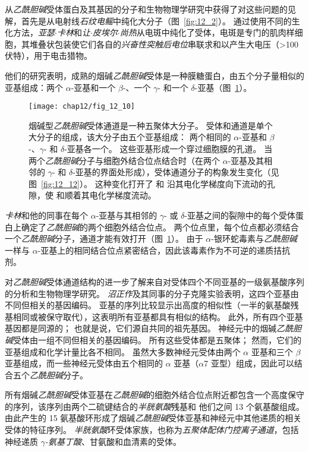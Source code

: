 从\textit{乙酰胆碱}受体蛋白及其基因的分子和生物物理学研究中获得了对这些问题的见解，首先是从电射线\textit{石纹电鳐}中纯化大分子（图~\ref{fig:12_2}）。
通过使用不同的生化方法，\textit{亚瑟$\cdot$卡林}和\textit{让$\cdot$皮埃尔$\cdot$尚热}从电斑中纯化了受体，电斑是专门的肌肉样细胞，其堆叠状包装使它们各自的\textit{兴奋性突触后电位}串联求和以产生大电压（>100 伏特），用于电击猎物。

他们的研究表明，成熟的烟碱\textit{乙酰胆碱}受体是一种膜糖蛋白，由五个分子量相似的亚基组成：两个 $\alpha$-亚基和一个 $\beta$-、一个 $\gamma$- 和一个 $\delta$-亚基（图~\ref{fig:12_10}）。


\begin{figure}[htbp]
	\centering
	\texttt{[image: chap12/fig\_12\_10]}
	\caption{烟碱型\textit{乙酰胆碱}受体通道是一种五聚体大分子。
		受体和通道是单个大分子的组成，该大分子由五个亚基组成：
		两个相同的 $\alpha$-亚基和 $\beta$-、$\gamma$- 和 $\delta$-亚基各一个。
		这些亚基形成一个穿过细胞膜的孔道。
		当两个\textit{乙酰胆碱}分子与细胞外结合位点结合时（在两个 $\alpha$-亚基及其相邻的 $\gamma$- 和 $\delta$-亚基的界面处形成），受体通道分子的构象发生变化（见图~\ref{fig:12_12}）。
		这种变化打开了  和  沿其电化学梯度向下流动的孔隙，使  和顺着其电化学梯度流动。}
	\label{fig:12_10}
\end{figure}


\textit{卡林}和他的同事在每个 $\alpha$-亚基与其相邻的 $\gamma$- 或 $\delta$-亚基之间的裂隙中的每个受体蛋白上确定了\textit{乙酰胆碱}的两个细胞外结合位点。
两个位点里，每个位点都必须结合一个\textit{乙酰胆碱}分子，通道才能有效打开（图~\ref{fig:12_10}）。
由于 $\alpha$-银环蛇毒素与\textit{乙酰胆碱}一样与 $\alpha$-亚基上的相同结合位点紧密结合，因此该毒素作为不可逆的递质拮抗剂。


对\textit{乙酰胆碱}受体通道结构的进一步了解来自对受体四个不同亚基的一级氨基酸序列的分析和生物物理学研究。
\textit{沼正作}及其同事的分子克隆实验表明，这四个亚基由不同但相关的基因编码。
亚基的序列比较显示出高度的相似性（一半的氨基酸残基相同或被保守取代），这表明所有亚基都具有相似的结构。 
此外，所有四个亚基基因都是同源的；
也就是说，它们源自共同的祖先基因。
神经元中的烟碱\textit{乙酰胆碱}受体由一组不同但相关的基因编码。
所有这些受体都是五聚体；
然而，它们的亚基组成和化学计量比各不相同。
虽然大多数神经元受体由两个 $\alpha$ 亚基和三个 $\beta$ 亚基组成，而一些神经元受体由五个相同的 $\alpha$ 亚基（$\alpha$7 亚型）组成，因此可以结合五个\textit{乙酰胆碱}分子。


所有烟碱\textit{乙酰胆碱}受体亚基在\textit{乙酰胆碱}的细胞外结合位点附近都包含一个高度保守的序列，该序列由两个二硫键结合的\textit{半胱氨酸}残基和 他们之间 13 个氨基酸组成。
由此产生的 15 氨基酸环形成了烟碱\textit{乙酰胆碱}受体亚基和神经元中其他递质的相关受体的特征序列。
\textit{半胱氨酸}环受体家族，也称为\textit{五聚体配体门控离子通道}，包括神经递质 \textit{$\gamma$-氨基丁酸}、甘氨酸和血清素的受体。


